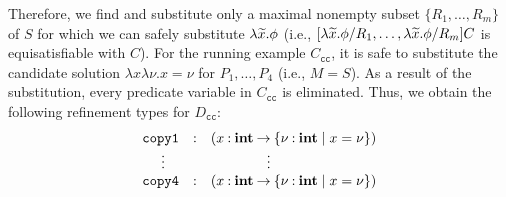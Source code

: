 Therefore, we find and substitute only a maximal nonempty subset 
\(\{R_1,\dots,R_m\}\) of \(S\) for which we can safely substitute 
\(\lambda\widetilde{x}.\phi\) (i.e., 
\([\lambda\widetilde{x}.\phi/R_1,\dots,\lambda\widetilde{x}.\phi/R_m]C\) is 
equisatisfiable with \(C\)).
%
%
For the running example \(C_{\texttt{cc}}\), it is safe to substitute 
the candidate solution \(\lambda x \lambda \nu.x=\nu\) for 
\(P_1,\dots,P_4\) (i.e., \(M=S\)).  As a result of the substitution, 
every predicate variable in \(C_{\texttt{cc}}\) is eliminated.  Thus, we 
obtain the following refinement types for \(D_{\texttt{cc}}\):
\[
\begin{array}{rcl}
\texttt{copy1}&\mathbin{:}&(x\mathbin{:}{\mathbf{int}}\mathbin{\rightarrow}{\{{\nu\mathbin{:}\mathbf{int} \mid x=\nu}\}}) \\
\vdots\quad &&\qquad\qquad \vdots \\
\texttt{copy4}&\mathbin{:}&(x\mathbin{:}{\mathbf{int}}\mathbin{\rightarrow}{\{{\nu\mathbin{:}\mathbf{int} \mid x=\nu}\}})
\end{array}
\]



%

